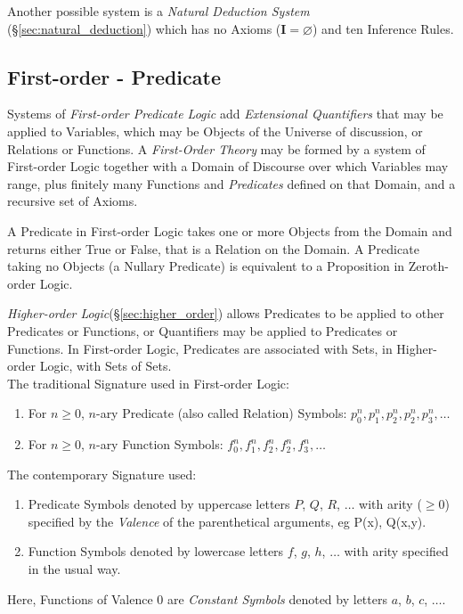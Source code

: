Another possible system is a \emph{Natural Deduction
  System}\cite{jaskowski34} (\S \ref{sec:natural_deduction})
which has no Axioms ($\mathbf{I}=\varnothing$) and ten Inference
Rules.



\subsection{First-order - Predicate}
\label{sec:predicate_logic}\label{sec:first_order}

Systems of \emph{First-order Predicate Logic} add \emph{Extensional
  Quantifiers} that may be applied to Variables, which may be Objects
of the Universe of discussion, or Relations or Functions. A
\emph{First-Order Theory} may be formed by a system of First-order
Logic together with a Domain of Discourse over which Variables may
range, plus finitely many Functions and \emph{Predicates} defined on
that Domain, and a recursive set of Axioms.

A Predicate in First-order Logic takes one or more Objects from the
Domain and returns either True or False, that is a Relation on the
Domain. A Predicate taking no Objects (a Nullary Predicate) is
equivalent to a Proposition in Zeroth-order Logic.

\emph{Higher-order Logic}(\S\ref{sec:higher_order}) allows Predicates
to be applied to other Predicates or Functions, or Quantifiers may be
applied to Predicates or Functions. In First-order Logic, Predicates
are associated with Sets, in Higher-order Logic, with Sets of
Sets.
\\
The traditional Signature used in First-order Logic:
\begin{enumerate}
\item For $n \geq 0$, $n$-ary Predicate (also called Relation)
  Symbols: $p^{n}_0, p^{n}_1, p^{n}_2, p^{n}_2, p^{n}_3, \ldots$
\item For $n \geq 0$, $n$-ary Function Symbols: $f^{n}_0, f^{n}_1,
  f^{n}_2, f^{n}_2, f^{n}_3, \ldots$
\end{enumerate}
The contemporary Signature used:
\begin{enumerate}
\item Predicate Symbols denoted by uppercase letters $P$, $Q$, $R$,
  $\ldots$ with arity ($\geq 0$) specified by the \emph{Valence} of the
  parenthetical arguments, eg P(x), Q(x,y).
\item Function Symbols denoted by lowercase letters $f$, $g$, $h$,
  $\ldots$ with arity specified in the usual way.
\end{enumerate}
Here, Functions of Valence 0 are \emph{Constant Symbols} denoted by
letters $a$, $b$, $c$, $\ldots$.

